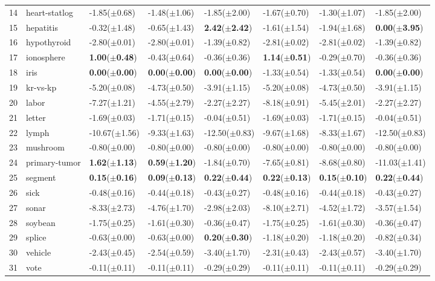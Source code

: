 \begin{table}[!tbp]
\begin{center}
\begin{tabular}{llllllll}
14&heart-statlog& -1.85($\pm$0.68)& -1.48($\pm$1.06)& -1.85($\pm$2.00)& -1.67($\pm$0.70)& -1.30($\pm$1.07)& -1.85($\pm$2.00)\tabularnewline
15&hepatitis& -0.32($\pm$1.48)& -0.65($\pm$1.43)&\textbf{  2.42}($\pm$\textbf{2.42})& -1.61($\pm$1.54)& -1.94($\pm$1.68)&\textbf{  0.00}($\pm$\textbf{3.95})\tabularnewline
16&hypothyroid& -2.80($\pm$0.01)& -2.80($\pm$0.01)& -1.39($\pm$0.82)& -2.81($\pm$0.02)& -2.81($\pm$0.02)& -1.39($\pm$0.82)\tabularnewline
17&ionosphere&\textbf{  1.00}($\pm$\textbf{0.48})& -0.43($\pm$0.64)& -0.36($\pm$0.36)&\textbf{  1.14}($\pm$\textbf{0.51})& -0.29($\pm$0.70)& -0.36($\pm$0.36)\tabularnewline
18&iris&\textbf{  0.00}($\pm$\textbf{0.00})&\textbf{  0.00}($\pm$\textbf{0.00})&\textbf{  0.00}($\pm$\textbf{0.00})& -1.33($\pm$0.54)& -1.33($\pm$0.54)&\textbf{  0.00}($\pm$\textbf{0.00})\tabularnewline
19&kr-vs-kp& -5.20($\pm$0.08)& -4.73($\pm$0.50)& -3.91($\pm$1.15)& -5.20($\pm$0.08)& -4.73($\pm$0.50)& -3.91($\pm$1.15)\tabularnewline
20&labor& -7.27($\pm$1.21)& -4.55($\pm$2.79)& -2.27($\pm$2.27)& -8.18($\pm$0.91)& -5.45($\pm$2.01)& -2.27($\pm$2.27)\tabularnewline
21&letter& -1.69($\pm$0.03)& -1.71($\pm$0.15)& -0.04($\pm$0.51)& -1.69($\pm$0.03)& -1.71($\pm$0.15)& -0.04($\pm$0.51)\tabularnewline
22&lymph&-10.67($\pm$1.56)& -9.33($\pm$1.63)&-12.50($\pm$0.83)& -9.67($\pm$1.68)& -8.33($\pm$1.67)&-12.50($\pm$0.83)\tabularnewline
23&mushroom& -0.80($\pm$0.00)& -0.80($\pm$0.00)& -0.80($\pm$0.00)& -0.80($\pm$0.00)& -0.80($\pm$0.00)& -0.80($\pm$0.00)\tabularnewline
24&primary-tumor&\textbf{  1.62}($\pm$\textbf{1.13})&\textbf{  0.59}($\pm$\textbf{1.20})& -1.84($\pm$0.70)& -7.65($\pm$0.81)& -8.68($\pm$0.80)&-11.03($\pm$1.41)\tabularnewline
25&segment&\textbf{  0.15}($\pm$\textbf{0.16})&\textbf{  0.09}($\pm$\textbf{0.13})&\textbf{  0.22}($\pm$\textbf{0.44})&\textbf{  0.22}($\pm$\textbf{0.13})&\textbf{  0.15}($\pm$\textbf{0.10})&\textbf{  0.22}($\pm$\textbf{0.44})\tabularnewline
26&sick& -0.48($\pm$0.16)& -0.44($\pm$0.18)& -0.43($\pm$0.27)& -0.48($\pm$0.16)& -0.44($\pm$0.18)& -0.43($\pm$0.27)\tabularnewline
27&sonar& -8.33($\pm$2.73)& -4.76($\pm$1.70)& -2.98($\pm$2.03)& -8.10($\pm$2.71)& -4.52($\pm$1.72)& -3.57($\pm$1.54)\tabularnewline
28&soybean& -1.75($\pm$0.25)& -1.61($\pm$0.30)& -0.36($\pm$0.47)& -1.75($\pm$0.25)& -1.61($\pm$0.30)& -0.36($\pm$0.47)\tabularnewline
29&splice& -0.63($\pm$0.00)& -0.63($\pm$0.00)&\textbf{  0.20}($\pm$\textbf{0.30})& -1.18($\pm$0.20)& -1.18($\pm$0.20)& -0.82($\pm$0.34)\tabularnewline
30&vehicle& -2.43($\pm$0.45)& -2.54($\pm$0.59)& -3.40($\pm$1.70)& -2.31($\pm$0.43)& -2.43($\pm$0.57)& -3.40($\pm$1.70)\tabularnewline
31&vote& -0.11($\pm$0.11)& -0.11($\pm$0.11)& -0.29($\pm$0.29)& -0.11($\pm$0.11)& -0.11($\pm$0.11)& -0.29($\pm$0.29)\tabularnewline

\end{tabular}
\end{center}
\end{table}
